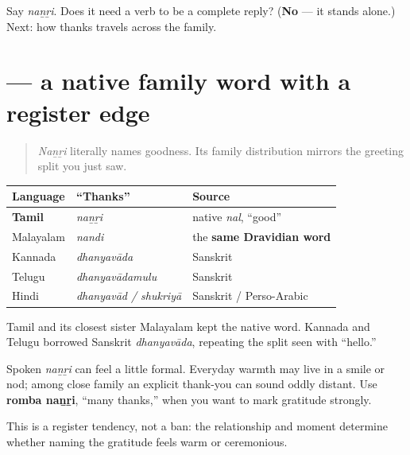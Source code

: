 \begin{tcolorbox}[breakable,colback=teal!4,colframe=teal!35!black,title={Before you move on}]
Say \emph{naṉṟi}. Does it need a verb to be a complete reply? (\textbf{No} — it stands alone.) Next: how thanks travels across the family.
\end{tcolorbox}
\section[\texorpdfstring{\ta{நன்றி} / \ml{നന്ദി} (naṉṟi / nandi)}{நன்றி / നന്ദി (naṉṟi / nandi)}]{ — a native family word with a register edge}

\label{lesson:TA-C01-nandri-family-register}



\begin{quote}
\emph{Naṉṟi} literally names goodness. Its family distribution mirrors the greeting split you just saw.
\end{quote}

\begin{cousinweb}
\noindent
\begin{tabularx}{\linewidth}{@{}>{\raggedright\arraybackslash}X>{\raggedright\arraybackslash}X>{\raggedright\arraybackslash}X@{}}
\toprule
\textbf{Language} & \textbf{\textquotedblleft{}Thanks\textquotedblright{}} & \textbf{Source} \\
\midrule
\textbf{Tamil} & \emph{naṉṟi} & native \emph{nal}, \textquotedblleft{}good\textquotedblright{} \\
Malayalam & \emph{nandi} & the \textbf{same Dravidian word} \\
Kannada & \emph{dhanyavāda} & Sanskrit \\
Telugu & \emph{dhanyavādamulu} & Sanskrit \\
Hindi & \emph{dhanyavād / shukriyā} & Sanskrit / Perso-Arabic \\
\bottomrule
\end{tabularx}

Tamil and its closest sister Malayalam kept the native word. Kannada and Telugu borrowed Sanskrit \emph{dhanyavāda}, repeating the split seen with \textquotedblleft{}hello.\textquotedblright{}
\end{cousinweb}

\begin{culture}
Spoken \emph{naṉṟi} can feel a little formal. Everyday warmth may live in a smile or nod; among close family an explicit thank-you can sound oddly distant. Use \textbf{romba naṉṟi}, \textquotedblleft{}many thanks,\textquotedblright{} when you want to mark gratitude strongly.

This is a register tendency, not a ban: the relationship and moment determine whether naming the gratitude feels warm or ceremonious.
\end{culture}

